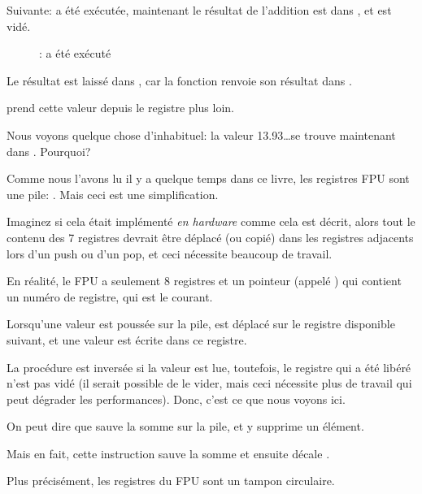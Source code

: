 \clearpage
Suivante: \FADDP a été exécutée, maintenant le résultat de l'addition est dans ,
et  est vidé.

\begin{figure}[H]
\centering
{}
\caption{\olly: \FADDP a été exécuté}
\label{fig:FPU_simple_olly_5}
\end{figure}

Le résultat est laissé dans , car la fonction renvoie son résultat dans .

\main prend cette valeur depuis le registre plus loin.

Nous voyons quelque chose d'inhabituel: la valeur 13.93\ldots se trouve maintenant
dans .
Pourquoi?

\label{FPU_is_rather_circular_buffer}

Comme nous l'avons lu il y a quelque temps dans ce livre, les registres \ac{FPU} sont
une pile: .
Mais ceci est une simplification.

Imaginez si cela était implémenté \emph{en hardware} comme cela est décrit, alors
tout le contenu des 7 registres devrait être déplacé (ou copié) dans les registres
adjacents lors d'un push ou d'un pop, et ceci nécessite beaucoup de travail.

En réalité, le \ac{FPU} a seulement 8 registres et un pointeur (appelé )
qui contient un numéro de registre, qui est le  courant.

Lorsqu'une valeur est poussée sur la pile,  est déplacé sur le registre
disponible suivant, et une valeur est écrite dans ce registre.

La procédure est inversée si la valeur est lue, toutefois, le registre qui a été
libéré n'est pas vidé (il serait possible de le vider, mais ceci nécessite plus de
travail qui peut dégrader les performances).
Donc, c'est ce que nous voyons ici.

On peut dire que \FADDP sauve la somme sur la pile, et y supprime un élément.

Mais en fait, cette instruction sauve la somme et ensuite décale .

Plus précisément, les registres du  \ac{FPU} sont un tampon circulaire.
